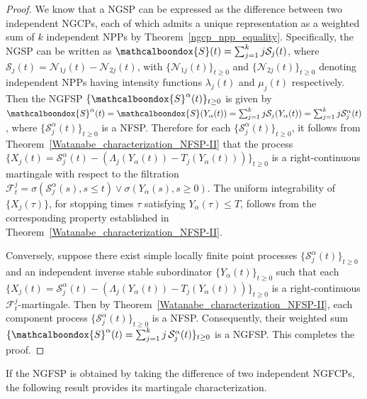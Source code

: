 \documentclass[11pt,oneside,reqno]{amsart}
\theoremstyle{definition}
\theoremstyle{remarkstyle}
\begin{document}
\begin{proof}
We know that a NGSP can be expressed as the difference between two independent NGCPs, each of which admits a unique representation as a weighted sum of $k$ independent NPPs by Theorem~\ref{ngcp_npp_equality}. Specifically, the NGSP can be written as $\mathcalboondox{S}(t)=\sum_{j=1}^{k} j\mathcal{S}_j(t)$, where $\mathcal{S}_j(t)=\mathcal{N}_{1j}(t)-\mathcal{N}_{2j}(t)$, with $\{\mathcal{N}_{1j}(t)\}_{t\ge0}$ and $\{\mathcal{N}_{2j}(t)\}_{t\ge0}$ denoting independent NPPs having intensity functions $\lambda_j(t)$ and $\mu_j(t)$ respectively. Then the NGFSP $\{\mathcalboondox{S}^{\alpha}(t)\}_{t\ge 0}$ is given by $\mathcalboondox{S}^{\alpha}(t)=\mathcalboondox{S}(Y_{\alpha}(t))=\sum_{j=1}^{k} j\mathcal{S}_j(Y_{\alpha}(t))=\sum_{j=1}^{k} j\mathcal{S}^{\alpha}_j(t)$, where $\{\mathcal{S}_j^{\alpha}(t)\}_{t\ge 0}$ is a NFSP. Therefore for each $\{\mathcal{S}_j^{\alpha}(t)\}_{t\ge 0}$, it follows from Theorem~\ref{Watanabe_characterization_NFSP-II} that the process $\{X_j(t)=\mathcal{S}^{\alpha}_{j}(t)-(\Lambda_j(Y_{\alpha}(t)) - T_j(Y_{\alpha}(t)))\}_{t\ge 0}$ is a right-continuous martingale with respect to the filtration $\mathcal{F}_t^j=\sigma(\mathcal{S}^{\alpha}_{j}(s),s\le t)\vee\sigma(Y_{\alpha}(s),s\ge0)$. The uniform integrability of $\{X_j(\tau)\}$, for stopping times $\tau$ satisfying $Y_{\alpha}(\tau)\le T$, follows from the corresponding property established in Theorem~\ref{Watanabe_characterization_NFSP-II}.

Conversely, suppose there exist simple locally finite point processes $\{\mathcal{S}^{\alpha}_{j}(t)\}_{t\ge0}$ and an independent inverse stable subordinator $\{Y_{\alpha}(t)\}_{t\ge 0}$ such that each $\{X_j(t)=\mathcal{S}^{\alpha}_{j}(t)-(\Lambda_j(Y_{\alpha}(t))-T_j(Y_{\alpha}(t)))\}_{t\ge 0}$ is a right-continuous $\mathcal{F}_t^j$-martingale. Then by Theorem~\ref{Watanabe_characterization_NFSP-II}, each component process $\{\mathcal{S}^{\alpha}_{j}(t)\}_{t\ge 0}$ is a NFSP. Consequently, their weighted sum $\{\mathcalboondox{S}^{\alpha}(t)=\sum_{j=1}^{k} j\,\mathcal{S}^{\alpha}_{j}(t)\}_{t\ge 0}$ is a NGFSP. This completes the proof.
\end{proof}
If the NGFSP is obtained by taking the difference of two independent NGFCPs, the following result provides its martingale characterization.
\end{document}
